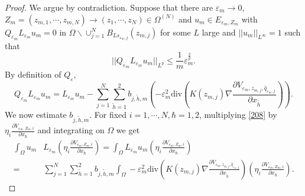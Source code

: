 \documentclass[12pt,reqno]{amsart}
\numberwithin{equation}{section}
\theoremstyle{definition}
\theoremstyle{remark}
\begin{document}
\begin{proof}
We argue by contradiction. Suppose that there are $ \varepsilon_m \to 0 $, $ Z_m=(z_{m,1},\cdots,z_{m,N})\to (z_{1},\cdots,z_{N})\in \Omega^{(N)} $  and $  u_m \in E_{\varepsilon_m, Z_m} $ with $ Q_{\varepsilon_m} L_{\varepsilon_m} u_m = 0 $ in $ \Omega \backslash\cup_{j=1}^NB_{Ls_{\varepsilon_m,j}}(z_{m,j}) $ for some $ L $ large and $ ||u_m||_{L^\infty}=1 $ such that
\begin{equation*}
||Q_{\varepsilon_m} L_{\varepsilon_m} u_m||_{L^p}\leq \frac{1}{m}\varepsilon_m^{\frac{2}{p}}.
\end{equation*}
By definition of $ Q_{\varepsilon}  $,
\begin{equation}\label{208}
Q_{\varepsilon_m} L_{\varepsilon_m} u_m=  L_{\varepsilon_m} u_m-\sum_{j=1}^N\sum_{\tilde{h}=1}^2b_{j,\tilde{h},m}\left( -\varepsilon_m^2\text{div}\left (K(z_{m,j})\nabla   \frac{\partial V_{\varepsilon_m, z_{m,j},\hat{q}_{\varepsilon_m,j}}}{\partial x_{\tilde{h}}}\right )\right) .
\end{equation}
We now estimate $ b_{j,\tilde{h},m} $. For fixed $ i=1,\cdots,N, \hbar=1,2 $, multiplying \eqref{208} by $ \eta_i\frac{\partial V_{\varepsilon_m, Z_{m},i}}{\partial x_\hbar} $ and integrating on $ \Omega $ we get
\begin{equation*}
\begin{split}
\int_{\Omega}u_m&L_{\varepsilon_m}\left( \eta_i\frac{\partial V_{\varepsilon_m, Z_{m},i}}{\partial x_\hbar}\right) =\int_{\Omega}L_{\varepsilon_m}u_m\left( \eta_i\frac{\partial V_{\varepsilon_m, Z_{m},i}}{\partial x_\hbar}\right) \\
=&\sum_{j=1}^N\sum_{\tilde{h}=1}^2b_{j,\tilde{h},m}\int_{\Omega}-\varepsilon_m^2\text{div}\left (K(z_{m,j})\nabla   \frac{\partial V_{\varepsilon_m, z_{m,j},\hat{q}_{\varepsilon_m,j}}}{\partial x_{\tilde{h}}}\right )\left( \eta_i\frac{\partial V_{\varepsilon_m, Z_{m},i}}{\partial x_\hbar}\right) .
\end{split}
\end{equation*}


\end{proof}
\end{document}
